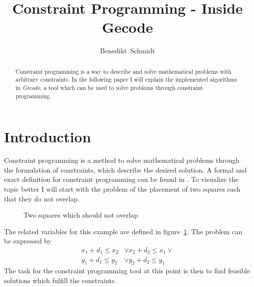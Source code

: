 \documentclass[10pt,
               a4paper,
               journal,
               ]{IEEEtran}
\makeatletter
\def\markboth#1#2{\def\leftmark{\@IEEEcompsoconly{\sffamily}\MakeUppercase{\protect#1}}%
\def\rightmark{\@IEEEcompsoconly{\sffamily}\MakeUppercase{\protect#2}}}
\newcommand{\reffig}[1]{{figure~\ref{#1}}}
\makeatother
\begin{document}
	\title{Constraint Programming - Inside Gecode}
	\author{Benedikt~Schmidt}
	\markboth{Advanced Seminar for Security in Information Technology, Summer Term 2014}%
	{Benedikt Schmidt: Constraint Programming - Inside Gecode}	
	\maketitle	
	
	\begin{abstract}	
		Constraint programming is a way to describe and solve mathematical problems with arbitrary constraints. In the following paper I will explain the implemented algorithms in \emph{Gecode}, a tool which can be used to solve problems through constraint programming.
	\end{abstract}
	
	\section{Introduction}
	Constraint programming is a method to solve mathematical problems through the formulation of constraints, which describe the desired solution. A formal and exact definition for constraint programming can be found in \cite[p.~16]{handbookCP}. To visualize the topic better I will start with the problem of the placement of two squares such that they do not overlap.	
	
	\begin{figure}
		\center
		\caption{Two squares which should not overlap}
		\label{fig:squares}
	\end{figure}
	
	The related variables for this example are defined in \reffig{fig:squares}. The problem can be expressed by \cite[p. 101]{programmingGecode}
	\begin{equation}
	\begin{split}
		x_1 + d_1 \le x_2 & \lor x_2 + d_2 \le x_1 \lor \\
		y_1 + d_1 \le y_2 & \lor y_2 + d_2 \le y_1
	\end{split}
	\label{eq:squares}
	\end{equation}
	The task for the constraint programming tool at this point is then to find feasible solutions which fulfill the constraints.
	
\end{document}
